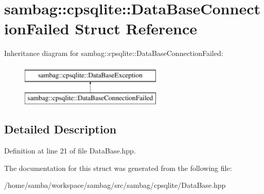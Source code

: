 \hypertarget{structsambag_1_1cpsqlite_1_1_data_base_connection_failed}{
\section{sambag::cpsqlite::DataBaseConnectionFailed Struct Reference}
\label{structsambag_1_1cpsqlite_1_1_data_base_connection_failed}
}
Inheritance diagram for sambag::cpsqlite::DataBaseConnectionFailed:\begin{figure}[H]
\begin{center}
\leavevmode
\includegraphics[height=2.000000cm]{structsambag_1_1cpsqlite_1_1_data_base_connection_failed}
\end{center}
\end{figure}


\subsection{Detailed Description}


Definition at line 21 of file DataBase.hpp.



The documentation for this struct was generated from the following file:\begin{DoxyCompactItemize}
\item 
/home/samba/workspace/sambag/src/sambag/cpsqlite/DataBase.hpp\end{DoxyCompactItemize}
